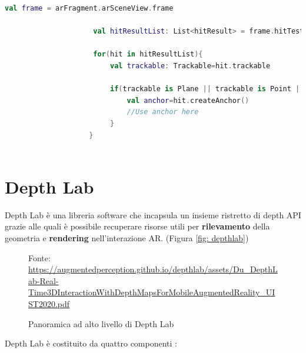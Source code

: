 \documentclass[crop=false, class=book]{standalone}
\begin{document}
		\begin{center}
				\begin{minipage}{0.95\textwidth}
					\begin{lstlisting}[caption={Depth Hit Test}, label={lst: Depth Hit Test}, language=Kotlin]
					 val frame = arFragment.arSceneView.frame
					
					 val hitResultList: List<hitResult> = frame.hitTest(tap)
					
					 for(hit in hitResultList){
						 val trackable: Trackable=hit.trackable
						
						 if(trackable is Plane || trackable is Point || trackable is DepthPoint){
							 val anchor=hit.createAnchor()
							 //Use anchor here
						 }
					}
					
				\end{lstlisting}
			\end{minipage}
		\end{center}
		
		
		\section{Depth Lab}
		
		Depth Lab è una libreria software che incapsula un insieme ristretto di depth API grazie alle quali è possibile 				recuperare risorse utili per \textbf{rilevamento } della geometria e \textbf{rendering} nell'interazione AR. (Figura 			\vref{fig: depthlab})
		
		\begin{figure}
				\centering
		{Fonte: \url{https://augmentedperception.github.io/depthlab/assets/Du_DepthLab-Real-Time3DInteractionWithDepthMapsForMobileAugmentedReality_UIST2020.pdf}}
				\caption{Panoramica ad alto livello di Depth Lab}
				\label{fig: depthlab}
		\end{figure}
		
		\begin{flushleft}
			Depth Lab è costituito da quattro componenti \cite{ruofeidu2020depthlab}:
		\end{flushleft}
		
\end{document}
